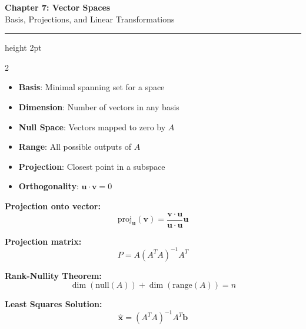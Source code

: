 \documentclass[11pt,letterpaper]{article}
\begin{document}
\begin{center}
{\LARGE\bfseries\color{primaryblue} Chapter 7: Vector Spaces}\\[3pt]
{\large Basis, Projections, and Linear Transformations}
\end{center}
\vspace{-5pt}
\hrule height 2pt
\vspace{8pt}

\begin{multicols}{2}

\begin{tcolorbox}[conceptbox, title={\faLightbulb\ Key Concepts}]
\begin{itemize}
    \item \textbf{Basis}: Minimal spanning set for a space
    \item \textbf{Dimension}: Number of vectors in any basis
    \item \textbf{Null Space}: Vectors mapped to zero by $A$
    \item \textbf{Range}: All possible outputs of $A$
    \item \textbf{Projection}: Closest point in a subspace
    \item \textbf{Orthogonality}: $\mathbf{u} \cdot \mathbf{v} = 0$
\end{itemize}
\end{tcolorbox}

\begin{tcolorbox}[formulabox, title={\faCalculator\ Core Formulas}]
\textbf{Projection onto vector:}
\[ \text{proj}_{\mathbf{u}}(\mathbf{v}) = \frac{\mathbf{v} \cdot \mathbf{u}}{\mathbf{u} \cdot \mathbf{u}} \mathbf{u} \]

\textbf{Projection matrix:}
\[ P = A(A^T A)^{-1} A^T \]

\textbf{Rank-Nullity Theorem:}
\[ \dim(\text{null}(A)) + \dim(\text{range}(A)) = n \]

\textbf{Least Squares Solution:}
\[ \hat{\mathbf{x}} = (A^T A)^{-1} A^T \mathbf{b} \]
\end{tcolorbox}

\columnbreak

\begin{center}
\end{center}
\end{multicols}
\end{document}
